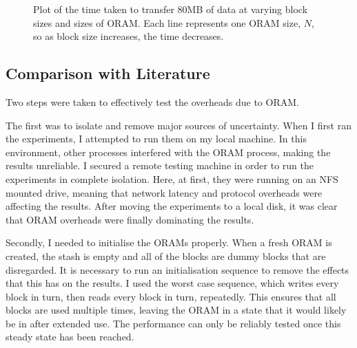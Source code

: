 \documentclass[12pt,a4paper,twoside,openright]{report}
\begin{document}
\begin{figure}
    \centering
    
    \caption{Plot of the time taken to transfer 80MB of data at varying block sizes and sizes of ORAM. Each line represents one ORAM size, $N$, so as block size increases, the time decreases.}
    \label{fig:blockSizeResults}
\end{figure}

\subsection{Comparison with Literature}
\label{subsec:comparisonWithLiterature}

Two steps were taken to effectively test the overheads due to ORAM.

The first was to isolate and remove major sources of uncertainty. When I first ran the experiments, I attempted to run them on my local machine. In this environment, other processes interfered with the ORAM process, making the results unreliable. I secured a remote testing machine in order to run the experiments in complete isolation. Here, at first, they were running on an NFS mounted drive, meaning that network latency and protocol overheads were affecting the results. After moving the experiments to a local disk, it was clear that ORAM overheads were finally dominating the results.

Secondly, I needed to initialise the ORAMs properly. When a fresh ORAM is created, the stash is empty and all of the blocks are dummy blocks that are disregarded. It is necessary to run an initialisation sequence to remove the effects that this has on the results. I used the worst case sequence, which writes every block in turn, then reads every block in turn, repeatedly. This ensures that all blocks are used multiple times, leaving the ORAM in a state that it would likely be in after extended use. The performance can only be reliably tested once this steady state has been reached.
\end{document}
